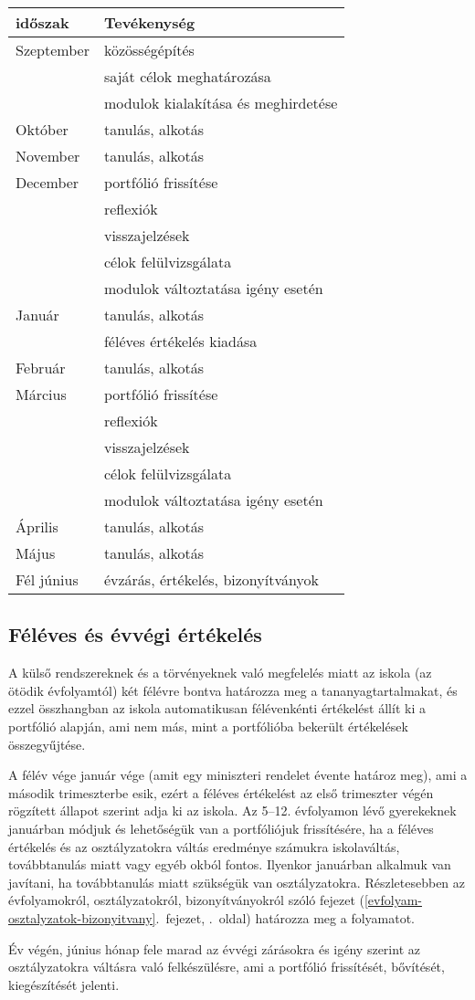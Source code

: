 \begin{longtable}[]{@{}ll@{}}
\toprule
időszak & Tevékenység\tabularnewline
\midrule
\endhead
Szeptember & közösségépítés\tabularnewline
& saját célok meghatározása\tabularnewline
& modulok kialakítása és meghirdetése\tabularnewline
Október & tanulás, alkotás\tabularnewline
November & tanulás, alkotás\tabularnewline
December & portfólió frissítése\tabularnewline
& reflexiók\tabularnewline
& visszajelzések\tabularnewline
& célok felülvizsgálata\tabularnewline
& modulok változtatása igény esetén\tabularnewline
Január & tanulás, alkotás\tabularnewline
& féléves értékelés kiadása\tabularnewline
Február & tanulás, alkotás\tabularnewline
Március & portfólió frissítése\tabularnewline
& reflexiók\tabularnewline
& visszajelzések\tabularnewline
& célok felülvizsgálata\tabularnewline
& modulok változtatása igény esetén\tabularnewline
Április & tanulás, alkotás\tabularnewline
Május & tanulás, alkotás\tabularnewline
Fél június & évzárás, értékelés, bizonyítványok\tabularnewline
\bottomrule
\end{longtable}

\hypertarget{feleves-es-evvegi-ertekeles}{%
\subsection{Féléves és évvégi
értékelés}\label{feleves-es-evvegi-ertekeles}}

A külső rendszereknek és a törvényeknek való megfelelés miatt az iskola
(az ötödik évfolyamtól) két félévre bontva határozza meg a
tananyagtartalmakat, és ezzel összhangban az iskola automatikusan félévenkénti értékelést
állít ki a portfólió alapján, ami nem más, mint a
portfólióba bekerült értékelések összegyűjtése.

A félév vége január vége (amit egy miniszteri rendelet évente határoz
meg), ami a második trimeszterbe esik, ezért a féléves értékelést az
első trimeszter végén rögzített állapot szerint adja ki az iskola. Az
5--12. évfolyamon lévő gyerekeknek januárban módjuk és lehetőségük van a
portfóliójuk frissítésére, ha a féléves értékelés és az osztályzatokra
váltás eredménye számukra iskolaváltás, továbbtanulás miatt vagy egyéb okból
fontos. Ilyenkor januárban alkalmuk van javítani, ha 
továbbtanulás miatt szükségük van osztályzatokra. Részletesebben az
évfolyamokról, osztályzatokról, bizonyítványokról szóló fejezet (\ref{evfolyam-osztalyzatok-bizonyitvany}.~fejezet, \pageref{evfolyam-osztalyzatok-bizonyitvany}.~oldal)
határozza meg a folyamatot.

Év végén, június hónap fele marad az évvégi zárásokra és igény szerint az
osztályzatokra váltásra való felkészülésre, ami a portfólió frissítését,
bővítését, kiegészítését jelenti.
